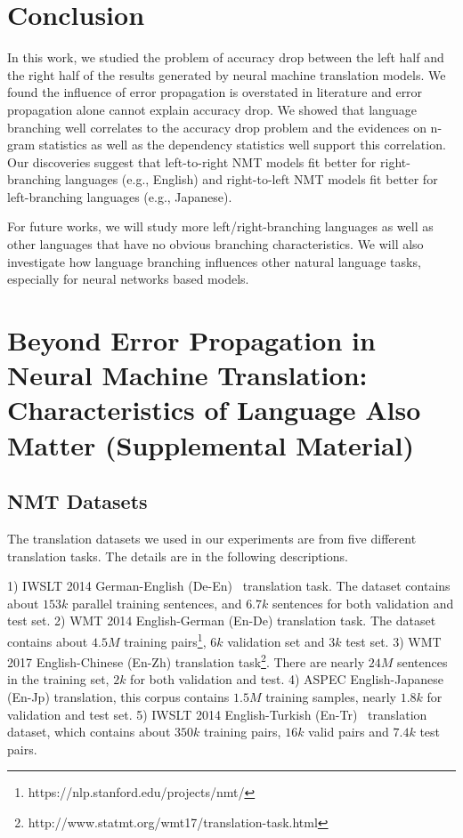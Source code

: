 \documentclass[11pt,a4paper]{article}
\begin{document}
\section{Conclusion}
\label{conclusion}
In this work, we studied the problem of accuracy drop between the left half and the right half of the results generated by neural machine translation models. We found the influence of error propagation is overstated in literature and error propagation alone cannot explain accuracy drop. We showed that language branching well correlates to the accuracy drop problem and the evidences on n-gram statistics as well as the dependency statistics well support this correlation. Our discoveries suggest that left-to-right NMT models fit better for right-branching languages (e.g., English) and right-to-left NMT models fit better for left-branching languages (e.g., Japanese).

For future works, we will study more left/right-branching languages as well as other languages that have no obvious branching characteristics. We will also investigate how language branching influences other natural language tasks, especially for neural networks based models.




\newpage
\appendix

\section{Beyond Error Propagation in Neural Machine Translation: Characteristics of Language Also Matter (Supplemental Material)}

\subsection{NMT Datasets}
The translation datasets we used in our experiments are from five different translation tasks. The details are in the following descriptions.

1) IWSLT 2014 German-English (De-En)~\cite{Cettolo2014Report} translation task. The dataset contains about $153k$ parallel training sentences, and $6.7k$ sentences for both validation and test set. 2) WMT 2014 English-German (En-De) translation task. The dataset contains about $4.5M$ training pairs\footnote{https://nlp.stanford.edu/projects/nmt/}, $6k$ validation set and $3k$ test set. 3) WMT 2017 English-Chinese (En-Zh) translation task\footnote{http://www.statmt.org/wmt17/translation-task.html}. There are nearly $24M$ sentences in the training set, $2k$ for both validation and test. 4) ASPEC English-Japanese (En-Jp) \cite{nakazawa2016aspec} translation, this corpus contains $1.5M$ training samples, nearly $1.8k$ for validation and test set. 5) IWSLT 2014 English-Turkish (En-Tr)~\cite{Cettolo2014Report} translation dataset, which contains about $350k$ training pairs, $16k$ valid pairs and $7.4k$ test pairs.
\end{document}
